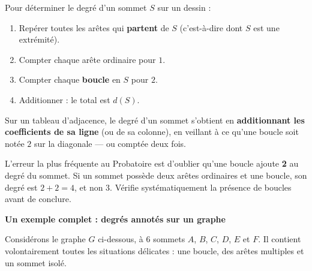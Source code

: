\documentclass[11pt]{article}
\newcommand{\cle}[1]{{\popxbold\color{popdark}#1}}
\begin{document}
\begin{methode}
Pour déterminer le degré d'un sommet $S$ sur un dessin :
\begin{enumerate}
\item Repérer toutes les arêtes qui \textbf{partent} de $S$ (c'est-à-dire dont $S$ est une extrémité).
\item Compter chaque arête ordinaire pour $1$.
\item Compter chaque \textbf{boucle} en $S$ pour $2$.
\item Additionner : le total est $d(S)$.
\end{enumerate}
Sur un tableau d'adjacence, le degré d'un sommet s'obtient en \textbf{additionnant les coefficients de sa ligne} (ou de sa colonne), en veillant à ce qu'une boucle soit notée $2$ sur la diagonale — ou comptée deux fois.
\end{methode}

\begin{attention}
L'erreur la plus fréquente au Probatoire est d'oublier qu'une \cle{boucle} ajoute \textbf{2} au degré du sommet. Si un sommet possède deux arêtes ordinaires et une boucle, son degré est $2 + 2 = 4$, et non $3$. Vérifie systématiquement la présence de boucles avant de conclure.
\end{attention}

\textbf{Un exemple complet : degrés annotés sur un graphe}\par

Considérons le graphe $G$ ci-dessous, à 6 sommets $A$, $B$, $C$, $D$, $E$ et $F$. Il contient volontairement toutes les situations délicates : une boucle, des arêtes multiples et un sommet isolé.
\end{document}
